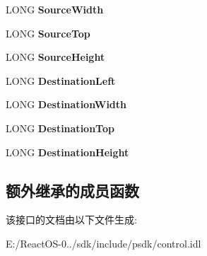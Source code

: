 \begin{DoxyCompactItemize}
L\+O\+NG {\bfseries Source\+Width}
\item 
\mbox{\label{interface_quartz_type_lib_1_1_i_basic_video_a555537c91f5c43e6fa5b81dc4afc405d}} 
L\+O\+NG {\bfseries Source\+Top}
\item 
\mbox{\label{interface_quartz_type_lib_1_1_i_basic_video_a35f5a1fd9f541a47e826584208dd94fa}} 
L\+O\+NG {\bfseries Source\+Height}
\item 
\mbox{\label{interface_quartz_type_lib_1_1_i_basic_video_a96587ba2034f940d0fefb6487756881d}} 
L\+O\+NG {\bfseries Destination\+Left}
\item 
\mbox{\label{interface_quartz_type_lib_1_1_i_basic_video_ad63d7b9683a5d078045ecac3962e987f}} 
L\+O\+NG {\bfseries Destination\+Width}
\item 
\mbox{\label{interface_quartz_type_lib_1_1_i_basic_video_a059e4b2317e4eedcb98c35e77911c0a4}} 
L\+O\+NG {\bfseries Destination\+Top}
\item 
\mbox{\label{interface_quartz_type_lib_1_1_i_basic_video_ad457f43d3b872c0f8545d2a754e80efc}} 
L\+O\+NG {\bfseries Destination\+Height}
\end{DoxyCompactItemize}
\subsection*{额外继承的成员函数}


该接口的文档由以下文件生成\+:\begin{DoxyCompactItemize}
\item 
E\+:/\+React\+O\+S-\/0../sdk/include/psdk/control.\+idl\end{DoxyCompactItemize}
